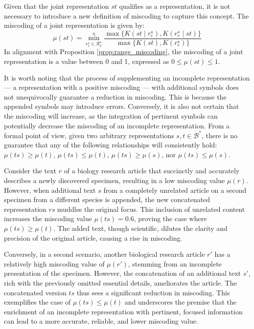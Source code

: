 Given that the joint representation $st$ qualifies as a representation, it is not necessary to introduce a new definition of miscoding to capture this concept. The miscoding of a joint representation is given by:
\[
\mu(st) = \overset{o}{ \underset{ r^\star_e \in \mathcal{R}^\star_\mathcal{E} } \min} \frac{ \max\{ K \left( st \mid r^\star_e \right), K \left( r^\star_e \mid st \right) \} } { \max\{ K \left( st \right), K \left( r^\star_e \right) \} }
\]
In alignment with Proposition \ref{prop:range_miscoding}, the miscoding of a joint representation is a value between 0 and 1, expressed as $0 \leq \mu(st) \leq 1$.

It is worth noting that the process of supplementing an incomplete representation — a representation with a positive miscoding — with additional symbols does not unequivocally guarantee a reduction in miscoding. This is because the appended symbols may introduce errors. Conversely, it is also not certain that the miscoding will increase, as the integration of pertinent symbols can potentially decrease the miscoding of an incomplete representation. From a formal point of view, given two arbitrary representations $s, t \in \mathcal{B}^\ast$, there is no guarantee that any of the following relationships will consistently hold: $\mu(ts) \geq \mu(t)$, $\mu(ts) \leq \mu(t)$, $\mu(ts) \geq \mu(s)$, nor $\mu(ts) \leq \mu(s)$.

\begin{example}
Consider the text $r$ of a biology research article that succinctly and accurately describes a newly discovered specimen, resulting in a low miscoding value $\mu(r)$. However, when additional text $s$ from a completely unrelated article on a second specimen from a different species is appended, the new concatenated representation $rs$ muddles the original focus. This inclusion of unrelated content increases the miscoding value $\mu(ts) = 0.6$, proving the case where $\mu(ts) \geq \mu(t)$. The added text, though scientific, dilutes the clarity and precision of the original article, causing a rise in miscoding.

Conversely, in a second scenario, another biological research article $r'$ has a relatively high miscoding value of $\mu(r')$, stemming from an incomplete presentation of the specimen. However, the concatenation of an additional text $s'$, rich with the previously omitted essential details, ameliorates the article. The concatenated version $ts$ thus sees a significant reduction in miscoding. This exemplifies the case of $\mu(ts) \leq \mu(t)$ and underscores the premise that the enrichment of an incomplete representation with pertinent, focused information can lead to a more accurate, reliable, and lower miscoding value.
\end{example}

